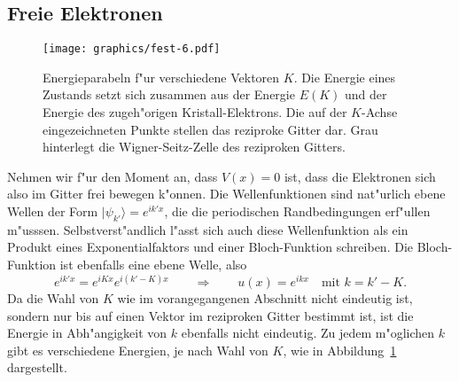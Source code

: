 \subsection{Freie Elektronen}
\begin{figure}
\centering
\texttt{[image: graphics/fest-6.pdf]}
\caption{Energieparabeln f"ur verschiedene Vektoren $K$. Die Energie
eines Zustands setzt sich zusammen aus der Energie $E(K)$ und der
Energie des zugeh"origen Kristall-Elektrons.
Die auf der $K$-Achse eingezeichneten Punkte stellen das reziproke
Gitter dar.
Grau hinterlegt die Wigner-Seitz-Zelle des reziproken Gitters.
\label{skript:dispersion}}
\end{figure}
Nehmen wir f"ur den Moment an, dass $V(x)=0$ ist, dass die Elektronen
sich also im Gitter frei bewegen k"onnen.
Die Wellenfunktionen sind nat"urlich ebene Wellen der Form
$|\psi_{k'}\rangle=e^{ik'x}$, die die periodischen Randbedingungen
erf"ullen m"usssen.
Selbstverst"andlich l"asst sich auch diese Wellenfunktion als ein
Produkt eines Exponentialfaktors und einer Bloch-Funktion schreiben.
Die Bloch-Funktion ist ebenfalls eine ebene Welle, also
\[
e^{ik'x}=e^{iKx}e^{i(k'-K)x}
\qquad\Rightarrow\qquad
u(x)=e^{ikx}\quad\text{mit $k=k'-K$.}
\]
Da die Wahl von $K$ wie im vorangegangenen Abschnitt nicht eindeutig ist,
sondern nur bis auf einen Vektor im reziproken Gitter bestimmt ist,
ist die Energie in Abh"angigkeit von $k$ ebenfalls nicht eindeutig.
Zu jedem m"oglichen $k$ gibt es verschiedene Energien, je nach Wahl
von $K$, wie in Abbildung~\ref{skript:dispersion} dargestellt.

